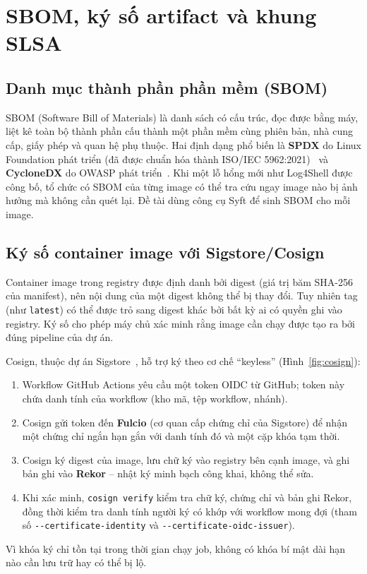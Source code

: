 \documentclass[12pt,a4paper,oneside]{extreport}
\begin{document}
\section{SBOM, ký số artifact và khung SLSA}
\label{sec:sbom-signing}
\subsection{Danh mục thành phần phần mềm (SBOM)}
SBOM (Software Bill of Materials) là danh sách có cấu trúc, đọc được bằng máy,
liệt kê toàn bộ thành phần cấu thành một phần mềm cùng phiên bản, nhà cung cấp,
giấy phép và quan hệ phụ thuộc. Hai định dạng phổ biến là \textbf{SPDX} do Linux
Foundation phát triển (đã được chuẩn hóa thành ISO/IEC 5962:2021)~\cite{spdx} và
\textbf{CycloneDX} do OWASP phát triển~\cite{cyclonedx}. Khi một lỗ hổng mới như
Log4Shell được công bố, tổ chức có SBOM của từng image có thể tra cứu ngay image
nào bị ảnh hưởng mà không cần quét lại. Đề tài dùng công cụ Syft để sinh SBOM
cho mỗi image.

\subsection{Ký số container image với Sigstore/Cosign}
Container image trong registry được định danh bởi digest (giá trị băm SHA-256
của manifest), nên nội dung của một digest không thể bị thay đổi. Tuy nhiên tag
(như \texttt{latest}) có thể được trỏ sang digest khác bởi bất kỳ ai có quyền
ghi vào registry. Ký số cho phép máy chủ xác minh rằng image cần chạy được tạo
ra bởi đúng pipeline của dự án.

Cosign, thuộc dự án Sigstore~\cite{sigstore-paper, sigstore}, hỗ trợ ký theo cơ chế
``keyless'' (Hình~\ref{fig:cosign}):
\begin{enumerate}
  \item Workflow GitHub Actions yêu cầu một token OIDC từ GitHub; token này chứa
  danh tính của workflow (kho mã, tệp workflow, nhánh).
  \item Cosign gửi token đến \textbf{Fulcio} (cơ quan cấp chứng chỉ của Sigstore)
  để nhận một chứng chỉ ngắn hạn gắn với danh tính đó và một cặp khóa tạm thời.
  \item Cosign ký digest của image, lưu chữ ký vào registry bên cạnh image, và
  ghi bản ghi vào \textbf{Rekor} -- nhật ký minh bạch công khai, không thể sửa.
  \item Khi xác minh, \texttt{cosign verify} kiểm tra chữ ký, chứng chỉ và bản
  ghi Rekor, đồng thời kiểm tra danh tính người ký có khớp với workflow mong đợi
  (tham số \texttt{-{}-certificate-identity} và
  \texttt{-{}-certificate-oidc-issuer}).
\end{enumerate}
Vì khóa ký chỉ tồn tại trong thời gian chạy job, không có khóa bí mật dài hạn
nào cần lưu trữ hay có thể bị lộ.
\end{document}
